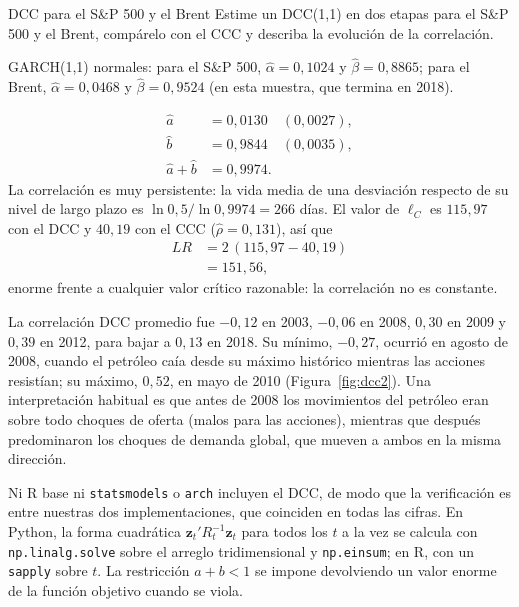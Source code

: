 \begin{ejresuelto}{DCC para el S\&P 500 y el Brent}\label{ej:dcc2}
\enunciado Estime un DCC(1,1) en dos etapas para el S\&P 500 y el Brent, compárelo con el CCC y describa la
evolución de la correlación.

\solucion
{} GARCH(1,1) normales: para el S\&P 500, $\hat\alpha=0{,}1024$ y $\hat\beta=0{,}8865$;
para el Brent, $\hat\alpha=0{,}0468$ y $\hat\beta=0{,}9524$ (en esta muestra, que termina en 2018).

\begin{align*}
  \hat a &= 0{,}0130\quad(0{,}0027),\\
  \hat b &= 0{,}9844\quad(0{,}0035),\\
  \hat a+\hat b &= 0{,}9974 .
\end{align*}
La correlación es muy persistente: la vida media de una desviación respecto de su nivel de largo plazo es
$\ln0{,}5/\ln0{,}9974=266$ días. El valor de $\ell_C$ es $115{,}97$ con el DCC y $40{,}19$ con el CCC
($\hat\rho=0{,}131$), así que
\begin{align*}
  LR &= 2\,(115{,}97-40{,}19)\\
     &= 151{,}56,
\end{align*}
enorme frente a cualquier valor crítico razonable: la correlación no es constante.

 La correlación DCC promedio fue $-0{,}12$ en 2003, $-0{,}06$ en 2008, $0{,}30$ en 2009 y
$0{,}39$ en 2012, para bajar a $0{,}13$ en 2018. Su mínimo, $-0{,}27$, ocurrió en agosto de 2008, cuando el petróleo
caía desde su máximo histórico mientras las acciones resistían; su máximo, $0{,}52$, en mayo de 2010
(Figura~\ref{fig:dcc2}). Una interpretación habitual es que antes de 2008 los movimientos del petróleo eran sobre
todo choques de oferta (malos para las acciones), mientras que después predominaron los choques de demanda
global, que mueven a ambos en la misma dirección.


\RvsPy Ni R base ni \texttt{statsmodels} o \texttt{arch} incluyen el DCC, de modo que la verificación es entre
nuestras dos implementaciones, que coinciden en todas las cifras. En Python, la forma cuadrática
$\mathbf z_t'R_t^{-1}\mathbf z_t$ para todos los $t$ a la vez se calcula con \texttt{np.linalg.solve} sobre el
arreglo tridimensional y \texttt{np.einsum}; en R, con un \texttt{sapply} sobre $t$. La restricción $a+b<1$ se
impone devolviendo un valor enorme de la función objetivo cuando se viola.


\end{ejresuelto}
